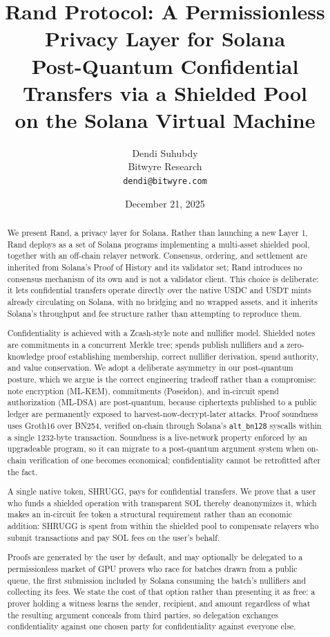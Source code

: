 \documentclass[11pt,a4paper]{article}
\title{\textbf{Rand Protocol: A Permissionless Privacy Layer for Solana}\\[0.5em]
\large Post-Quantum Confidential Transfers via a Shielded Pool\\on the Solana Virtual Machine}
\author{Dendi Suhubdy\\
Bitwyre Research\\
\texttt{dendi@bitwyre.com}}
\date{December 21, 2025}
\begin{document}
\maketitle

\begin{abstract}
We present Rand, a privacy layer for Solana. Rather than launching a new Layer 1, Rand deploys as a set of Solana programs implementing a multi-asset shielded pool, together with an off-chain relayer network. Consensus, ordering, and settlement are inherited from Solana's Proof of History and its validator set; Rand introduces no consensus mechanism of its own and is not a validator client. This choice is deliberate: it lets confidential transfers operate directly over the native USDC and USDT mints already circulating on Solana, with no bridging and no wrapped assets, and it inherits Solana's throughput and fee structure rather than attempting to reproduce them.

Confidentiality is achieved with a Zcash-style note and nullifier model. Shielded notes are commitments in a concurrent Merkle tree; spends publish nullifiers and a zero-knowledge proof establishing membership, correct nullifier derivation, spend authority, and value conservation. We adopt a deliberate asymmetry in our post-quantum posture, which we argue is the correct engineering tradeoff rather than a compromise: note encryption (ML-KEM), commitments (Poseidon), and in-circuit spend authorization (ML-DSA) are post-quantum, because ciphertexts published to a public ledger are permanently exposed to harvest-now-decrypt-later attacks. Proof soundness uses Groth16 over BN254, verified on-chain through Solana's \texttt{alt\_bn128} syscalls within a single 1232-byte transaction. Soundness is a live-network property enforced by an upgradeable program, so it can migrate to a post-quantum argument system when on-chain verification of one becomes economical; confidentiality cannot be retrofitted after the fact.

A single native token, SHRUGG, pays for confidential transfers. We prove that a user who funds a shielded operation with transparent SOL thereby deanonymizes it, which makes an in-circuit fee token a structural requirement rather than an economic addition: SHRUGG is spent from within the shielded pool to compensate relayers who submit transactions and pay SOL fees on the user's behalf.

Proofs are generated by the user by default, and may optionally be delegated to a permissionless market of GPU provers who race for batches drawn from a public queue, the first submission included by Solana consuming the batch's nullifiers and collecting its fees. We state the cost of that option rather than presenting it as free: a prover holding a witness learns the sender, recipient, and amount regardless of what the resulting argument conceals from third parties, so delegation exchanges confidentiality against one chosen party for confidentiality against everyone else.
\end{abstract}
\end{document}
